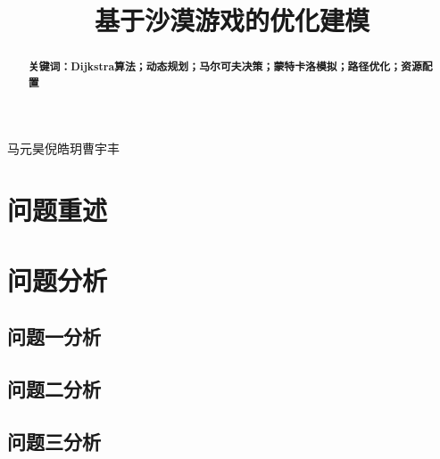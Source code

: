 \documentclass[UTF8]{ctexart}
\begin{document}
\vspace{80pt}

\title{基于沙漠游戏的优化建模}

\maketitle

\begin{center}
    \begin{minipage}{6cm}
        马元昊\:倪皓玥\:曹宇丰
    \end{minipage}
\end{center}

\begin{abstract}


\indent \textbf{关键词：Dijkstra算法；动态规划；马尔可夫决策；蒙特卡洛模拟；路径优化；资源配置}

\end{abstract}

\newpage

\section{问题重述}



\section{问题分析}
\subsection{问题一分析}


\subsection{问题二分析}

\subsection{问题三分析}

\end{document}
